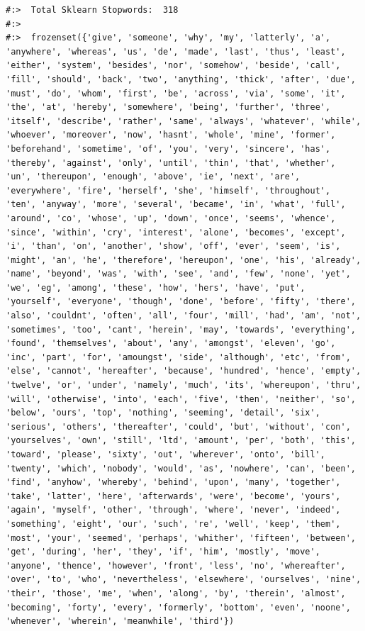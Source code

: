 \documentclass[
]{book}
\begin{document}
\begin{verbatim}
#:>  Total Sklearn Stopwords:  318 
#:> 
#:>  frozenset({'give', 'someone', 'why', 'my', 'latterly', 'a', 'anywhere', 'whereas', 'us', 'de', 'made', 'last', 'thus', 'least', 'either', 'system', 'besides', 'nor', 'somehow', 'beside', 'call', 'fill', 'should', 'back', 'two', 'anything', 'thick', 'after', 'due', 'must', 'do', 'whom', 'first', 'be', 'across', 'via', 'some', 'it', 'the', 'at', 'hereby', 'somewhere', 'being', 'further', 'three', 'itself', 'describe', 'rather', 'same', 'always', 'whatever', 'while', 'whoever', 'moreover', 'now', 'hasnt', 'whole', 'mine', 'former', 'beforehand', 'sometime', 'of', 'you', 'very', 'sincere', 'has', 'thereby', 'against', 'only', 'until', 'thin', 'that', 'whether', 'un', 'thereupon', 'enough', 'above', 'ie', 'next', 'are', 'everywhere', 'fire', 'herself', 'she', 'himself', 'throughout', 'ten', 'anyway', 'more', 'several', 'became', 'in', 'what', 'full', 'around', 'co', 'whose', 'up', 'down', 'once', 'seems', 'whence', 'since', 'within', 'cry', 'interest', 'alone', 'becomes', 'except', 'i', 'than', 'on', 'another', 'show', 'off', 'ever', 'seem', 'is', 'might', 'an', 'he', 'therefore', 'hereupon', 'one', 'his', 'already', 'name', 'beyond', 'was', 'with', 'see', 'and', 'few', 'none', 'yet', 'we', 'eg', 'among', 'these', 'how', 'hers', 'have', 'put', 'yourself', 'everyone', 'though', 'done', 'before', 'fifty', 'there', 'also', 'couldnt', 'often', 'all', 'four', 'mill', 'had', 'am', 'not', 'sometimes', 'too', 'cant', 'herein', 'may', 'towards', 'everything', 'found', 'themselves', 'about', 'any', 'amongst', 'eleven', 'go', 'inc', 'part', 'for', 'amoungst', 'side', 'although', 'etc', 'from', 'else', 'cannot', 'hereafter', 'because', 'hundred', 'hence', 'empty', 'twelve', 'or', 'under', 'namely', 'much', 'its', 'whereupon', 'thru', 'will', 'otherwise', 'into', 'each', 'five', 'then', 'neither', 'so', 'below', 'ours', 'top', 'nothing', 'seeming', 'detail', 'six', 'serious', 'others', 'thereafter', 'could', 'but', 'without', 'con', 'yourselves', 'own', 'still', 'ltd', 'amount', 'per', 'both', 'this', 'toward', 'please', 'sixty', 'out', 'wherever', 'onto', 'bill', 'twenty', 'which', 'nobody', 'would', 'as', 'nowhere', 'can', 'been', 'find', 'anyhow', 'whereby', 'behind', 'upon', 'many', 'together', 'take', 'latter', 'here', 'afterwards', 'were', 'become', 'yours', 'again', 'myself', 'other', 'through', 'where', 'never', 'indeed', 'something', 'eight', 'our', 'such', 're', 'well', 'keep', 'them', 'most', 'your', 'seemed', 'perhaps', 'whither', 'fifteen', 'between', 'get', 'during', 'her', 'they', 'if', 'him', 'mostly', 'move', 'anyone', 'thence', 'however', 'front', 'less', 'no', 'whereafter', 'over', 'to', 'who', 'nevertheless', 'elsewhere', 'ourselves', 'nine', 'their', 'those', 'me', 'when', 'along', 'by', 'therein', 'almost', 'becoming', 'forty', 'every', 'formerly', 'bottom', 'even', 'noone', 'whenever', 'wherein', 'meanwhile', 'third'})
\end{verbatim}
\end{document}

